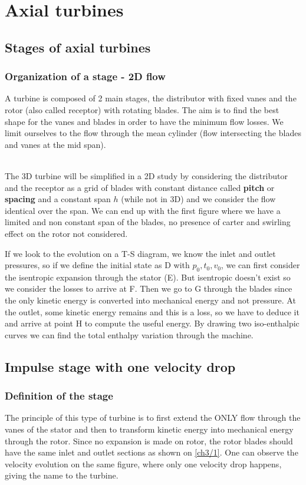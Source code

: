 \chapter{Axial turbines}
\section{Stages of axial turbines}
\subsection{Organization of a stage - 2D flow}
A turbine is composed of 2 main stages, the distributor with fixed vanes and the rotor (also called receptor) with rotating blades. The aim is to find the best shape for the vanes and blades in order to have the minimum flow losses. We limit ourselves to the flow through the mean cylinder (flow intersecting the blades and vanes at the mid span). \\


\ \\
The 3D turbine will be simplified in a 2D study by considering the distributor and the receptor as a grid of blades with constant distance called \textbf{pitch} or \textbf{spacing} and a constant span $h$ (while not in 3D) and we consider the flow identical over the span. We can end up with the first figure where we have a limited and non constant span of the blades, no presence of carter and swirling effect on the rotor not considered. 

If we look to the evolution on a T-S diagram, we know the inlet and outlet pressures, so if we define the initial state as D with $p_0,t_0,v_0$, we can first consider the isentropic expansion through the stator (E). But isentropic doesn't exist so we consider the losses to arrive at F. Then we go to G through the blades since the only kinetic energy is converted into mechanical energy and not pressure. At the outlet, some kinetic energy remains and this is a loss, so we have to deduce it and arrive at point H to compute the useful energy. By drawing two iso-enthalpic curves we can find the total enthalpy variation through the machine. 

\section{Impulse stage with one velocity drop}
\subsection{Definition of the stage}
The principle of this type of turbine is to first extend the ONLY flow through the vanes of the stator and then to transform kinetic energy into mechanical energy through the rotor. Since no expansion is made on rotor, the rotor blades should have the same inlet and outlet sections as shown on \autoref{ch3/1}. One can observe the velocity evolution on the same figure, where only one velocity drop happens, giving the name to the turbine. 

